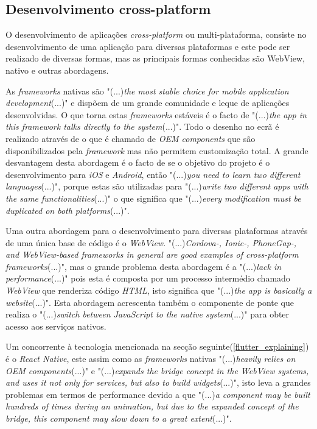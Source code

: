 \subsection{Desenvolvimento cross-platform}
O desenvolvimento de aplicações \textit{cross-platform} ou multi-plataforma, consiste no desenvolvimento de uma aplicação para diversas plataformas e este pode ser realizado de diversas formas, mas as principais formas conhecidas são WebView, nativo e outras abordagens.

As \emph{frameworks} nativas são "(...)\emph{the most stable choice for mobile application development}(...)"\citep{flutter} e dispõem de um grande comunidade e leque de aplicações desenvolvidas. O que torna estas \textit{frameworks} estáveis é o facto de "(...)\emph{the app in this framework talks directly to the system}(...)"\citep{flutter}. Todo o desenho no ecrã é realizado através de o que é chamado de \emph{OEM components} que são disponibilizados pela \emph{framework} mas não permitem customização total. A grande desvantagem desta abordagem é o facto de se o objetivo do projeto é o desenvolvimento para \textit{iOS} e \textit{Android}, então "(...)\emph{you need to learn two different languages}(...)"\citep{flutter}, porque estas são utilizadas para "(...)\emph{write two different apps with the same functionalities}(...)"\citep{flutter} o que significa que "(...)\emph{every modification must be duplicated on both platforms}(...)"\citep{flutter}.

Uma outra abordagem para o desenvolvimento para diversas plataformas através de uma única base de código é o \textit{WebView}. "(...)\emph{Cordova-, Ionic-, PhoneGap-, and WebView-based frameworks in general are good examples of cross-platform frameworks}(...)"\citep{flutter}, mas o grande problema desta abordagem é a "(...)\emph{lack in performance}(...)"\citep{flutter} pois esta é composta por um processo intermédio chamado \textit{WebView} que renderiza código \textit{HTML}, isto significa que "(...)\emph{the app is basically a website}(...)"\citep{flutter}.
Esta abordagem acrescenta também o componente de ponte que realiza o "(...)\emph{switch between JavaScript to the native system}(...)"\citep{flutter} para obter acesso aos serviços nativos.

Um concorrente à tecnologia mencionada na secção seguinte(\ref{flutter_explaining}) é o \textit{React Native}, este assim como as \textit{frameworks} nativas "(...)\emph{heavily relies on OEM components}(...)"\citep{flutter} e "(...)\emph{expands the bridge concept in the WebView systems, and uses it not only for services, but also to build widgets}(...)"\citep{flutter}, isto leva a grandes problemas em termos de performance devido a que "(...)\emph{a component may be built hundreds of times during an animation, but due to the expanded concept of the bridge, this component may slow down to a great extent}(...)"\citep{flutter}.